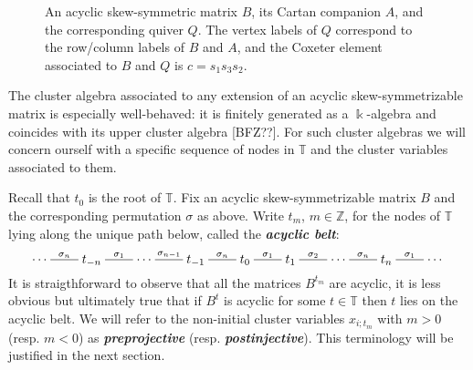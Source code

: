 \documentclass[12pt]{amsart}
\newcommand{\saySS}[1]{\say[SS]{\color{blue}{\bf SS:}\;#1}}
\newcommand{\newword}[1]{\textbf{\emph{#1}}}
\newcommand{\TT}{\mathbb{T}}
\newcommand{\ZZ}{\mathbb{Z}}
\newcommand{\kk}{\Bbbk}%
\newcommand{\dashname}[1]{\stackrel{#1}{\begin{picture}(22,3)\put(0,2.5){\line(1,0){22}}\end{picture}}}
\theoremstyle{remark}
\numberwithin{equation}{section}
\begin{document}
\begin{figure}[h]
  \centering
  \caption{
    An acyclic skew-symmetric matrix $B$, its Cartan companion $A$, and the corresponding quiver $Q$. 
    The vertex labels of $Q$ correspond to the row/column labels of $B$ and $A$, and the Coxeter element associated to $B$ and $Q$ is $c = s_1 s_3 s_2$.
  }
  \label{fig:matrices}
\end{figure}  

The cluster algebra associated to any extension of an acyclic skew-symmetrizable matrix is especially well-behaved: it is finitely generated as a $\kk$-algebra and coincides with its upper cluster algebra [BFZ??].
For such cluster algebras we will concern ourself with a specific sequence of nodes in $\TT$ and the cluster variables associated to them.

Recall that $t_0$ is the root of $\TT$.  Fix an acyclic skew-symmetrizable matrix $B$ and the corresponding permutation $\sigma$ as above.
Write $t_m$, $m\in\ZZ$, for the nodes of $\TT$ lying along the unique path below, called the \newword{acyclic belt}:
\begin{equation}
  \cdots
  \dashname{\sigma_n}
  t_{-n}
  \dashname{\sigma_1}
  \cdots
  \dashname{\sigma_{n-1}}
  t_{-1}
  \dashname{\sigma_n}
  t_0
  \dashname{\sigma_1}
  t_1
  \dashname{\sigma_2}
  \cdots
  \dashname{\sigma_n}
  t_n
  \dashname{\sigma_1}
  \cdots
\end{equation}
It is straigthforward to observe that all the matrices $B^{t_m}$ are acyclic, it is less obvious but ultimately true that if $B^t$ is acyclic for some $t\in\TT$ then $t$ lies on the acyclic belt.
\saySS{Citation needed}
We will refer to the non-initial cluster variables $x_{i;t_m}$ with $m>0$ (resp. $m<0$) as \newword{preprojective} (resp. \newword{postinjective}).
This terminology will be justified in the next section.
\end{document}
